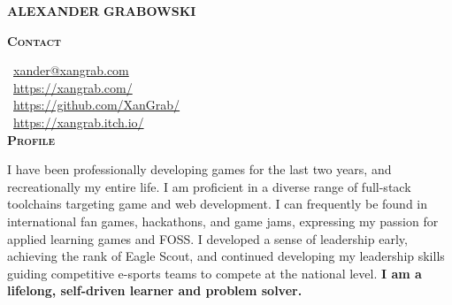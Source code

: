 \documentclass[11pt, a4paper]{article}
\newcommand{\headleft}[1]{\vspace*{3ex}\textsc{\textbf{#1}}\par%
    \vspace*{-2ex}\hrulefill\par\vspace*{0.7ex}}
\begin{document}
\setlength{\topskip}{0pt}
\setlength{\parindent}{0pt}
\setlength{\parskip}{0pt}
\setlength{\fboxsep}{0pt}
\pagestyle{empty}
\raggedbottom

\begin{minipage}[t]{0.33\textwidth} %

\vspace{-.2ex} %
\colorbox{cvblue!90}{\color{white}\hfill  %
\textwidth\relax%
\begin{minipage}[t][298mm][t]{0.84\textwidth}
\raggedright
\vspace*{1.5ex}

\vspace{3ex}
\begin{center}
    \Huge \textbf{ALEXANDER}\vspace{0.5ex}
    \textbf{GRABOWSKI} \normalsize 
\end{center}

\vspace*{-2.5ex} 

\headleft{Contact}
\faEnvelope\ \href{mailto:xander@xangrab.com}{xander@xangrab.com} \\[0.4ex]

\faGlobe\ \href{https://xangrab.com/}{https://xangrab.com/} \\[0.4ex]

\faGithub\ \href{https://github.com/XanGrab/}{https://github.com/XanGrab/} \\[0.4ex]

\faItchIo\ \href{https://xangrab.itch.io/}{https://xangrab.itch.io/} \\[0.4ex]


\headleft{Profile}
I have been professionally developing games for the last two years, and recreationally my entire life. I am proficient in a diverse range of full-stack toolchains targeting game and web development. I can frequently be found in international fan games, hackathons, and game jams, expressing my passion for applied learning games and FOSS. I developed a sense of leadership early, achieving the rank of Eagle Scout, and continued developing my leadership skills guiding competitive e-sports teams to compete at the national level. \textbf{I am a lifelong, self-driven learner and problem solver.}


\end{minipage}}
\end{minipage}
\end{document}

